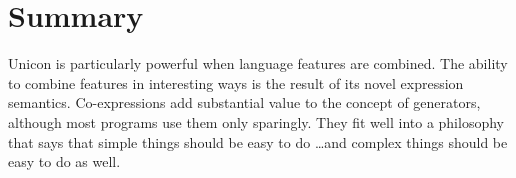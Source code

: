  

\section*{Summary}

Unicon is particularly powerful when language features are
combined. The ability to combine features in interesting ways is the
result of its novel expression semantics. Co-expressions add
substantial value to the concept of generators,
although most programs use them only sparingly. They fit well into a
philosophy that says that simple things should be easy to do \ldots and
complex things should be easy to do as well.


